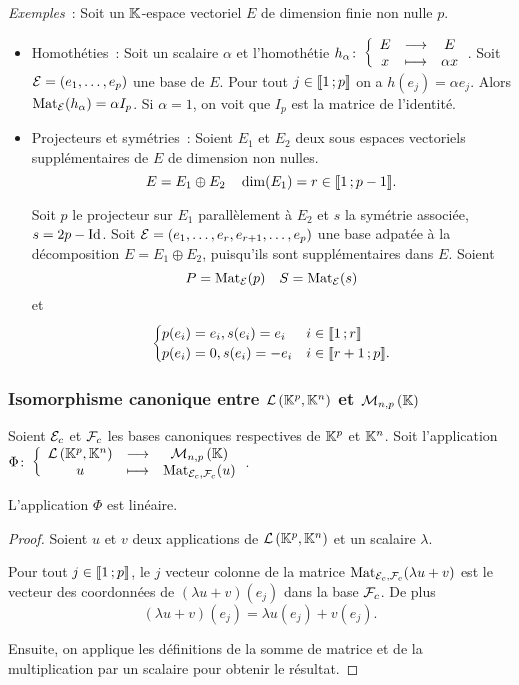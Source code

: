 \emph{Exemples}~: Soit un $\mathbb{K}$-espace vectoriel $E$ de dimension finie non nulle $p$.
\begin{itemize}
\item Homothéties~: Soit un scalaire $\alpha$ et l'homothétie $h_\alpha\colon \left\{\begin{array}{ccc} E & \longrightarrow &E\\ x & \longmapsto & \alpha x \end{array} \right.$. Soit $\mathcal{E}=(e_1,\ldots, e_p)$ une base de $E$. Pour tout $j \in \mathopen{\llbracket}1\mathclose{}\mathpunct{};p\mathclose{\rrbracket}$ on a $h(e_j)=\alpha e_j$. Alors $\mathrm{Mat}_{\mathcal{E}}(h_\alpha)=\alpha I_p$. Si $\alpha=1$, on voit que $I_p$ est la matrice de l'identité.
\item Projecteurs et symétries~: Soient $E_1$ et $E_2$ deux sous espaces vectoriels supplémentaires de $E$ de dimension non nulles.
  \begin{equation}
    E=E_1 \oplus E_2 \quad \dim(E_1)=r \in \mathopen{\llbracket}1\mathclose{}\mathpunct{};p-1\mathclose{\rrbracket}.
  \end{equation}

Soit $p$ le projecteur sur $E_1$ parallèlement à $E_2$ et $s$ la symétrie associée, $s=2p -\operatorname{Id}$. Soit $\mathcal{E}=(e_1, \ldots, e_r, e_{r+1}, \ldots, e_p)$ une base adpatée à la décomposition $E=E_1 \oplus E_2$, puisqu'ils sont supplémentaires dans $E$. Soient
\begin{equation}
  P=\mathrm{Mat}_{\mathcal{E}}(p) \quad S=\mathrm{Mat}_{\mathcal{E}}(s)
\end{equation}
et
\begin{equation}
  \begin{cases}
    p(e_i)=e_i, s(e_i)=e_i & i \in \mathopen{\llbracket}1\mathclose{}\mathpunct{};r\mathclose{\rrbracket} \\
    p(e_i)=0, s(e_i)=-e_i & i \in \mathopen{\llbracket}r+1\mathclose{}\mathpunct{};p\mathclose{\rrbracket}.
  \end{cases}
\end{equation}
\end{itemize}

\subsubsection{Isomorphisme canonique entre $\mathcal{L}\left(\mathbb{K}^p,\mathbb{K}^n\right)$ et $\mathcal{M}_{n,p}\left(\mathbb{K}\right)$}


Soient $\mathcal{E}_c$ et $\mathcal{F}_c$ les bases canoniques respectives de $\mathbb{K}^p$ et $\mathbb{K}^n$. Soit l'application $\Phi\colon \left\{\begin{array}{ccc} \mathcal{L}\left(\mathbb{K}^p,\mathbb{K}^n\right) & \longrightarrow &\mathcal{M}_{n,p}\left(\mathbb{K}\right)\\ u & \longmapsto & \mathrm{Mat}_{\mathcal{E}_c,\mathcal{F}_c}(u) \end{array} \right.$.

\begin{prop}
  L'application $\Phi$ est linéaire.
\end{prop}
\begin{proof}
  Soient $u$ et $v$ deux applications de $\mathcal{L}\left(\mathbb{K}^p,\mathbb{K}^n\right)$ et un scalaire $\lambda$. 

Pour tout $j \in \mathopen{\llbracket}1\mathclose{}\mathpunct{};p\mathclose{\rrbracket}$, le $j$\ieme{} vecteur colonne de la matrice $\mathrm{Mat}_{\mathcal{E}_c,\mathcal{F}_c}(\lambda u+v)$ est le vecteur des coordonnées de $(\lambda u+v)(e_j)$ dans la base $\mathcal{F}_c$. De plus
\begin{equation}
  (\lambda u+v)(e_j) = \lambda u(e_j) +v(e_j).
\end{equation}

Ensuite, on applique les définitions de la somme de matrice et de la multiplication par un scalaire pour obtenir le résultat.
\end{proof}

